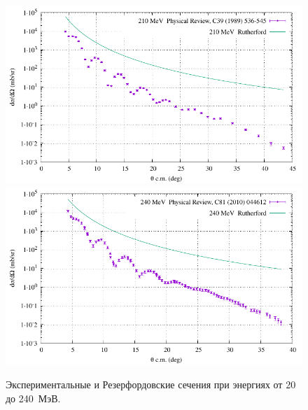 \documentclass[a4paper, 12pt]{article}
\begin{document}
\begin{figure}[b]
	\includegraphics[width=.49\linewidth]{figures/cmp-210mev-abs.pdf}
	\includegraphics[width=.49\linewidth]{figures/cmp-240mev-abs.pdf}
	\caption{Экспериментальные и Резерфордовские сечения при энергиях от 20 до 240~МэВ.~\cite{20mev,26-28-30-34mev,32mev,88mev,99mev,156mev,210mev,240mev}}
	\label{fig:othermev-cmp}
\end{figure}%
\end{document}
